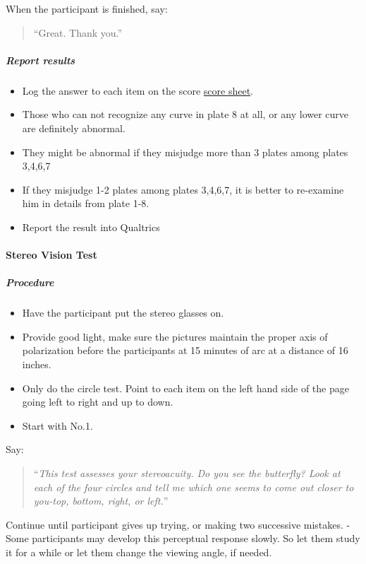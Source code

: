 \documentclass[]{article}
\providecommand{\tightlist}{%
  \setlength{\itemsep}{0pt}\setlength{\parskip}{0pt}}
\let\oldparagraph\paragraph
\renewcommand{\paragraph}[1]{\oldparagraph{#1}\mbox{}}
\let\oldsubparagraph\subparagraph
\renewcommand{\subparagraph}[1]{\oldsubparagraph{#1}\mbox{}}
\begin{document}
When the participant is finished, say:

\begin{quote}
``Great. Thank you.''
\end{quote}

\subparagraph{Report results}\label{report-results-1}

\begin{itemize}
\tightlist
\item
  Log the answer to each item on the score
  \href{vision-screening-score-sheet.html}{score sheet}.
\item
  Those who can not recognize any curve in plate 8 at all, or any lower
  curve are definitely abnormal.
\item
  They might be abnormal if they misjudge more than 3 plates among
  plates 3,4,6,7
\item
  If they misjudge 1-2 plates among plates 3,4,6,7, it is better to
  re-examine him in details from plate 1-8.
\item
  Report the result into Qualtrics
\end{itemize}

\paragraph{Stereo Vision Test}\label{stereo-vision-test}

\subparagraph{Procedure}\label{procedure-2}

\begin{itemize}
\tightlist
\item
  Have the participant put the stereo glasses on.
\item
  Provide good light, make sure the pictures maintain the proper axis of
  polarization before the participants at 15 minutes of arc at a
  distance of 16 inches.
\item
  Only do the circle test. Point to each item on the left hand side of
  the page going left to right and up to down.
\item
  Start with No.1.
\end{itemize}

Say:

\begin{quote}
``\emph{This test assesses your stereoacuity. Do you see the butterfly?
Look at each of the four circles and tell me which one seems to come out
closer to you-top, bottom, right, or left.}''
\end{quote}

Continue until participant gives up trying, or making two successive
mistakes. - Some participants may develop this perceptual response
slowly. So let them study it for a while or let them change the viewing
angle, if needed.
\end{document}
